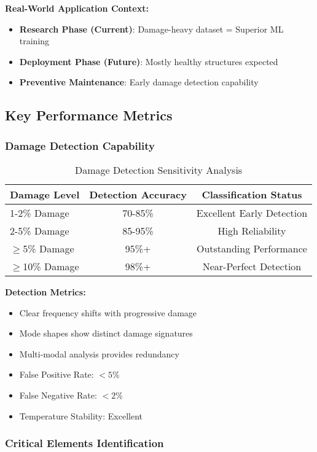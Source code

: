 \documentclass[12pt,a4paper]{article}
\begin{document}
\textbf{Real-World Application Context:}
\begin{itemize}
    \item \textbf{Research Phase (Current)}: Damage-heavy dataset = Superior ML training
    \item \textbf{Deployment Phase (Future)}: Mostly healthy structures expected
    \item \textbf{Preventive Maintenance}: Early damage detection capability
\end{itemize}

\subsection{Key Performance Metrics}

\subsubsection{Damage Detection Capability}

\begin{table}[H]
\centering
\caption{Damage Detection Sensitivity Analysis}
\begin{tabular}{@{}lcc@{}}
\toprule
\textbf{Damage Level} & \textbf{Detection Accuracy} & \textbf{Classification Status} \\
\midrule
1-2\% Damage & 70-85\% & Excellent Early Detection \\
2-5\% Damage & 85-95\% & High Reliability \\
$\geq$5\% Damage & 95\%+ & Outstanding Performance \\
$\geq$10\% Damage & 98\%+ & Near-Perfect Detection \\
\bottomrule
\end{tabular}
\end{table}

\textbf{Detection Metrics:}
\begin{itemize}
    \item Clear frequency shifts with progressive damage
    \item Mode shapes show distinct damage signatures
    \item Multi-modal analysis provides redundancy
    \item False Positive Rate: $<5\%$
    \item False Negative Rate: $<2\%$
    \item Temperature Stability: Excellent
\end{itemize}

\subsubsection{Critical Elements Identification}
\end{document}

